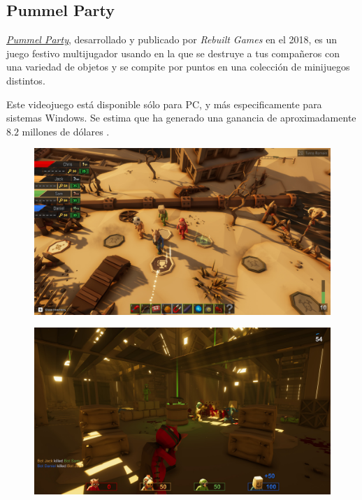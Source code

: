 \subsection{Pummel Party}

\href{http://www.rebuiltgames.com/}{\emph{Pummel Party}}, desarrollado y
publicado por \emph{Rebuilt Games} en el 2018, es un juego festivo multijugador
usando en la que se destruye a tus compañeros con una variedad de objetos y se
compite por puntos en una colección de minijuegos distintos.

Este videojuego está disponible sólo para PC, y más especificamente para
sistemas Windows. Se estima que ha generado una ganancia de aproximadamente
$8.2$ millones de dólares \cite{noauthor_pummel_nodate}.

\begin{figure}[H]
    \centering
    \begin{minipage}{0.40\textwidth}
        \centering
        \includegraphics[width=1.0\textwidth]{5-Cuerpo/Chapter3/PMP1.jpg} %
        \label{PMP-Tablero}
    \end{minipage}\hfill
    \begin{minipage}{0.40\textwidth}
        \centering
        \includegraphics[width=1.0\textwidth]{5-Cuerpo/Chapter3/PMP2.jpg} %
        \label{PMP-Shooter}
    \end{minipage}
\end{figure}
